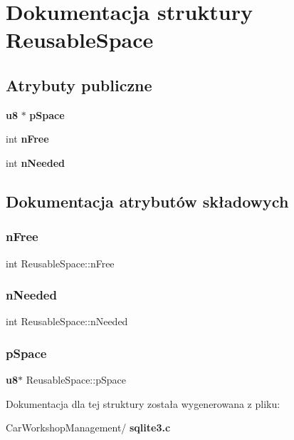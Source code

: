 \section{Dokumentacja struktury Reusable\+Space}
\label{struct_reusable_space}
\subsection*{Atrybuty publiczne}
\begin{DoxyCompactItemize}
\item 
\textbf{ u8} $\ast$ \textbf{ p\+Space}
\item 
int \textbf{ n\+Free}
\item 
int \textbf{ n\+Needed}
\end{DoxyCompactItemize}


\subsection{Dokumentacja atrybutów składowych}
\mbox{\label{struct_reusable_space_a0be5d91e907e20632e3f508e34fb7989}} 
\subsubsection{nFree}
{\footnotesize\ttfamily int Reusable\+Space\+::n\+Free}

\mbox{\label{struct_reusable_space_ac67d036d43ab721121af005f5ce88199}} 
\subsubsection{nNeeded}
{\footnotesize\ttfamily int Reusable\+Space\+::n\+Needed}

\mbox{\label{struct_reusable_space_a457bb011e90fd7c4eb61c79925720981}} 
\subsubsection{pSpace}
{\footnotesize\ttfamily \textbf{ u8}$\ast$ Reusable\+Space\+::p\+Space}



Dokumentacja dla tej struktury została wygenerowana z pliku\+:\begin{DoxyCompactItemize}
\item 
Car\+Workshop\+Management/\textbf{ sqlite3.\+c}\end{DoxyCompactItemize}

